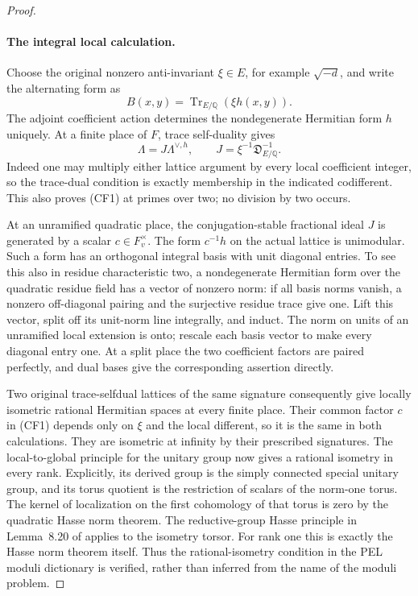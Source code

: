 \begin{proof}
\paragraph{The integral local calculation.}
Choose the original nonzero anti-invariant $\xi\in E$, for example
$\sqrt{-d}$, and write the alternating form as
\[
                 B(x,y)=\operatorname{Tr}_{E/\mathbb Q}
                                      (\xi h(x,y)).
\]
The adjoint coefficient action determines the nondegenerate Hermitian
form $h$ uniquely.  At a finite place of $F$, trace self-duality gives
\[
 \Lambda=J\Lambda^{\vee,h},\qquad
 J=\xi^{-1}\mathfrak D_{E/\mathbb Q}^{-1}.
                                                        \tag{CF1}
\]
Indeed one may multiply either lattice argument by every local
coefficient integer, so the trace-dual condition is exactly membership
in the indicated codifferent.  This also proves (CF1) at primes over
two; no division by two occurs.

At an unramified quadratic place, the conjugation-stable fractional
ideal $J$ is generated by a scalar $c\in F_v^\times$.
The form $c^{-1}h$ on the actual lattice is unimodular.  Such a form
has an orthogonal integral basis with unit diagonal entries.  To see
this also in residue characteristic two, a nondegenerate Hermitian
form over the quadratic residue field has a vector of nonzero norm:
if all basis norms vanish, a nonzero off-diagonal pairing and the
surjective residue trace give one.  Lift this vector, split off its
unit-norm line integrally, and induct.  The norm on units of an
unramified local extension is onto\cite{component-field-cft}; rescale
each basis vector to make every diagonal entry one.
At a split place the two coefficient factors are paired perfectly,
and dual bases give the corresponding assertion directly.

Two original trace-selfdual lattices of the same signature consequently
give locally isometric rational Hermitian spaces at every finite place.
Their common factor $c$ in (CF1) depends only on $\xi$ and the local
different, so it is the same in both calculations.  They are isometric
at infinity by their prescribed signatures.  The local-to-global
principle for the unitary group now gives a rational isometry in every
rank.  Explicitly, its derived group is the simply connected special
unitary group, and its torus quotient is the restriction of scalars
of the norm-one torus.  The kernel of localization on the first
cohomology of that torus is zero by the quadratic Hasse norm theorem.
The reductive-group Hasse principle in Lemma~8.20 of
\cite{component-field-shimura} applies to the isometry torsor.
For rank one this is exactly the Hasse norm theorem itself.
Thus the rational-isometry condition in the PEL moduli dictionary is
verified, rather than inferred from the name of the moduli problem.


\end{proof}
